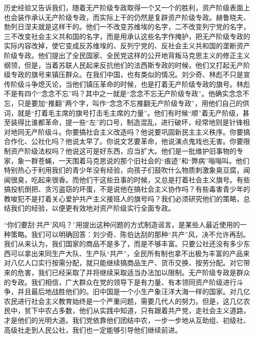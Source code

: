 \begin{maonote}
历史经验又告诉我们，随着无产阶级专政取得一个又一个的胜利，资产阶级表面上也会装作承认无产阶级专政，而实际上干的仍然是复辟资产阶级专政。赫鲁晓夫、勃列日涅夫就是这样干的。他们一不改变苏维埃的名字，二不改变列宁党的名字，三不改变社会主义共和国的名字，而是用承认这些名字作掩护，把无产阶级专政的实际内容改掉，使它变成反苏维埃的、反列宁党的、反社会主义共和国的垄断资产阶级专政。他们提出了全民国家、全民党这样的公开地背叛马克思主义的修正主义纲领，但是，当着苏联人民起来反抗他们的法西斯专政的时候，他们又打起无产阶级专政的旗号来镇压群众。在我们中国，也有类似的情况。刘少奇、林彪不只是宣传阶级斗争熄灭论，当他们镇压革命的时候，也是打着无产阶级专政的旗号。林彪不是有四个“念念不忘”吗？其中之一就是“念念不忘无产阶级专政”。他确实念念不忘，只是要加“推翻”两个字，叫作“念念不忘推翻无产阶级专政”，用他们自己的供词，就是“打着毛主席的旗号打击毛主席的力量”。他们有时候“顺”着无产阶级，甚至装得比谁都革命，提一些“左”的口号，制造混乱，进行破坏，经常地则是针锋相对地同无产阶级斗。你要搞社会主义改造吗？他说要巩固新民主主义秩序。你要搞合作化、公社化吗？他说太早了。你说文艺要革命，他说演点鬼戏也无害。你要限制资产阶级法权吗？他说这可是好东西，应当扩大。他们是一批维护旧事物的专家，象一群苍蝇，一天围着马克思说的那个旧社会的“痕迹”和“弊病”嗡嗡叫。他们特别热心于利用我们的青少年没有经验，向孩子们鼓吹什么物质刺激象臭豆腐，闻闻很臭，吃起来很香。而他们干这些丑事的时候，又总是打着社会主义旗号。有些搞投机倒把、贪污盗窃的坏蛋，不是说他在搞社会主义协作吗？有些毒害青少年的教唆犯不是打着关心爱护共产主义接班人的旗号吗？我们必须研究他们的策略，总结我们的经验，以便更有效地对资产阶级实行全面专政。

“你们要刮‘共产’风吗？”用提出这种问题的方式制造谣言，是某些人最近使用的一种策略。我们可以明确回答：刘少奇、陈伯达刮的那种“共产”风，决不允许再刮。我们从来认为，我们国家的商品不是多了，而是不够丰富。只要公社还没有多少东西可以拿出来同生产大队、生产队“共产”，全民所有制也拿不出极为丰富的产品来对八亿人口实行按需分配，就只能继续搞商品生产、货币交换、按劳分配。对它带来的危害，我们已经采取了并将继续采取适当办法加以限制。无产阶级专政是群众的专政。我们相信，广大群众在党的领导下是有力量、有本领同资产阶级进行斗争，并且最后地战胜他们的。旧中国是一个小生产象汪洋大海一样的国家。对几亿农民进行社会主义教育始终是一个严重问题，需要几代人的努力。但是，这几亿农民中，贫下中农占多数，他们从实践中知道，只有跟着共产党，走社会主义道路，才是他们的光明大道。我们党依靠他们团结中农，一步一步地从互助组、初级社、高级社走到人民公社，我们也一定能够引导他们继续前进。


\end{maonote}
